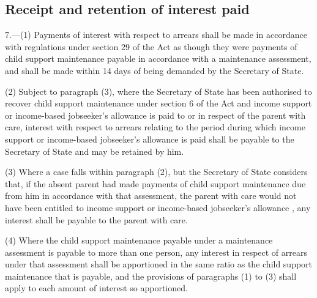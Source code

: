 \documentclass[12pt,a4paper]{article}
\begin{document}
{

\subsection[7. Receipt and retention of interest paid]{Receipt and retention of interest paid}

7.—(1) Payments of interest with respect to arrears shall be made in accordance with regulations under section 29 of the Act as though they were payments of child support maintenance payable in accordance with a maintenance assessment, and shall be made within 14 days of being demanded by the Secretary of State.

(2) Subject to paragraph (3), where the Secretary of State has been authorised to recover child support maintenance under section 6 of the Act and income support
or income-based jobseeker’s allowance  %
is paid to or in respect of the parent with care, interest with respect to arrears relating to the period during which income support 
or income-based jobseeker’s allowance  %
is paid shall be payable to the Secretary of State and may be retained by him.

(3) Where a case falls within paragraph (2), but the Secretary of State considers that, if the absent parent had made payments of child support maintenance due from him in accordance with that assessment, the parent with care would not have been entitled to income support
or income-based jobseeker’s allowance%
, any interest shall be payable to the parent with care.

(4) Where the child support maintenance payable under a maintenance assessment is payable to more than one person, any interest in respect of arrears under that assessment shall be apportioned in the same ratio as the child support maintenance that is payable, and the provisions of paragraphs (1) to (3) shall apply to each amount of interest so apportioned.

}
\end{document}

